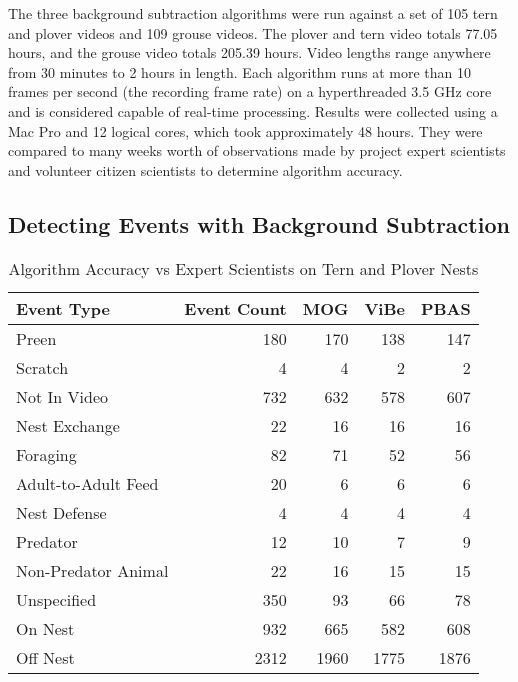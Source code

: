 The three background subtraction algorithms were run against a set of 105 tern and plover videos and 109 grouse videos. The plover and tern video totals 77.05 hours, and the grouse video totals 205.39 hours. Video lengths range anywhere from 30 minutes to 2 hours in length. Each algorithm runs at more than 10 frames per second (the recording frame rate) on a hyperthreaded 3.5 GHz core and is considered capable of real-time processing. Results were collected using a Mac Pro and 12 logical cores, which took approximately 48 hours. They were compared to many weeks worth of observations made by project expert scientists and volunteer citizen scientists to determine algorithm accuracy.


\subsection{Detecting Events with Background Subtraction}
\label{sec:event_detection}

\begin{table}
\centering
\caption{Algorithm Accuracy vs Expert Scientists on Tern and Plover Nests}
\label{table:algorithm_accuracy_experts}
\begin{tabular}{lrrrr}
    \toprule
    Event Type & Event Count & MOG & ViBe & PBAS\\
    \midrule
    Preen & 180 & 170 & 138 & 147\\
    Scratch & 4 & 4 & 2 & 2\\
    Not In Video & 732 & 632 & 578 & 607\\
    Nest Exchange & 22 & 16 & 16 & 16\\
    Foraging & 82 & 71 & 52 & 56\\
    Adult-to-Adult Feed & 20 & 6 & 6 & 6\\
    Nest Defense & 4 & 4 & 4 & 4\\
    Predator & 12 & 10 & 7 & 9\\
    Non-Predator Animal & 22 & 16 & 15 & 15\\
    Unspecified & 350 & 93 & 66 & 78\\
    On Nest & 932 & 665 & 582 & 608\\
    Off Nest & 2312 & 1960 & 1775 & 1876\\
    \bottomrule
\end{tabular}
\end{table}

